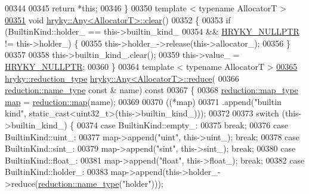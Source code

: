 \begin{DoxyCode}
00344 
00345     \textcolor{keywordflow}{return} *\textcolor{keyword}{this};
00346 \}
00350 \textcolor{keyword}{template} < \textcolor{keyword}{typename} AllocatorT >
\hypertarget{any_8h_source_l00351}{}\hyperlink{classhryky_1_1_any_a307624acbd5252242b0665a0d5d5e62e}{00351} \textcolor{keywordtype}{void} \hyperlink{namespacehryky_aa201297ea9530da954a7230be71cc19d}{hryky::Any<AllocatorT>::clear}()
00352 \{
00353     \textcolor{keywordflow}{if} (BuiltinKind::holder\_ == this->builtin\_kind\_
00354         && \hyperlink{common_8h_a4cd4ac09cfcdbd6b30ee69afc156e210}{HRYKY_NULLPTR} != this->holder\_) \{
00355         this->holder\_->release(this->allocator\_);
00356     \}
00357 
00358     this->builtin\_kind\_.clear();
00359     this->value\_ = \hyperlink{common_8h_a4cd4ac09cfcdbd6b30ee69afc156e210}{HRYKY_NULLPTR};
00360 \}
00364 \textcolor{keyword}{template} < \textcolor{keyword}{typename} AllocatorT >
\hypertarget{any_8h_source_l00365}{}\hyperlink{classhryky_1_1_any_a53cbd925fa67505daab6e79749559517}{00365} \hyperlink{classhryky_1_1_intrusive_ptr}{hryky::reduction_type} \hyperlink{namespacehryky_af41cb3af6766761da0ff21b84527a52c}{hryky::Any<AllocatorT>::reduce}(
00366     \hyperlink{classhryky_1_1reduction_1_1_string}{reduction::name_type} \textcolor{keyword}{const} & name)\textcolor{keyword}{ const}
00367 \textcolor{keyword}{}\{
00368     \hyperlink{classhryky_1_1_intrusive_ptr}{reduction::map_type} \hyperlink{namespacehryky_1_1reduction_ac5eae270cf8047b294dc4ff3e5e11a79}{map} = \hyperlink{namespacehryky_1_1reduction_ac5eae270cf8047b294dc4ff3e5e11a79}{reduction::map}(name);
00369 
00370     ((*map)
00371      .append(\textcolor{stringliteral}{"builtin kind"}, static\_cast<uint32\_t>(this->builtin\_kind\_)));
00372 
00373     \textcolor{keywordflow}{switch} (this->builtin\_kind\_) \{
00374     \textcolor{keywordflow}{case} BuiltinKind::empty\_:
00375         \textcolor{keywordflow}{break};
00376     \textcolor{keywordflow}{case} BuiltinKind::uint\_:
00377         map->append(\textcolor{stringliteral}{"uint"}, this->uint\_); \textcolor{keywordflow}{break};
00378     \textcolor{keywordflow}{case} BuiltinKind::sint\_:
00379         map->append(\textcolor{stringliteral}{"sint"}, this->sint\_); \textcolor{keywordflow}{break};
00380     \textcolor{keywordflow}{case} BuiltinKind::float\_:
00381         map->append(\textcolor{stringliteral}{"float"}, this->float\_); \textcolor{keywordflow}{break};
00382     \textcolor{keywordflow}{case} BuiltinKind::holder\_:
00383         map->append(this->holder\_->reduce(\hyperlink{classhryky_1_1reduction_1_1_string}{reduction::name_type}(\textcolor{stringliteral}{"holder"}))); \textcolor{keywordflow}{
}
\end{DoxyCode}

